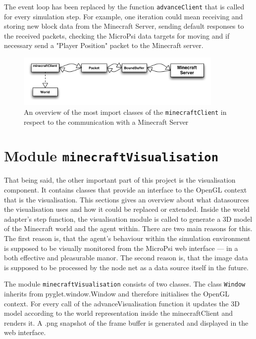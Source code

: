 The event loop has been replaced by the function \texttt{advanceClient} that is called for every simulation step. For example, one iteration could mean receiving and storing new block data from the Minecraft Server, sending default responses to the received packets, checking the MicroPsi data targets for moving and if necessary send a "Player Position" packet to the Minecraft server.

\begin{figure}[h]
  \centering
    \includegraphics[width=10cm]{graphics/spock_overview}
  \caption{An overview of the most import classes of the \texttt{minecraftClient} in respect to the communication with a Minecraft Server}
  \label{spock_overview}
\end{figure}

    \section{Module \texttt{minecraftVisualisation}}
That being said, the other important part of this project is the visualisation component. It contains classes that provide an interface to the OpenGL context that is the visualisation. This sections gives an overview about what datasources the visualisation uses and how it could be replaced or extended. Inside the world adapter's step function, the visualisation module is called to generate a 3D model of the Minecraft world and the agent within. There are two main reasons for this. The first reason is, that the agent's behaviour within the simulation environment is supposed to be visually monitored from the MicroPsi web interface --- in a both effective and pleasurable manor. The second reason is, that the image data is supposed to be processed by the node net as a data source itself in the future.

The module \texttt{minecraftVisualisation} consists of two classes. The class \texttt{Window} inherits from pyglet.window.Window and therefore initialises the OpenGL context. For every call of the advanceVisualisation function it updates the 3D model according to the world representation inside the minecraftClient and renders it. A .png snapshot of the frame buffer is generated and displayed in the web interface.

